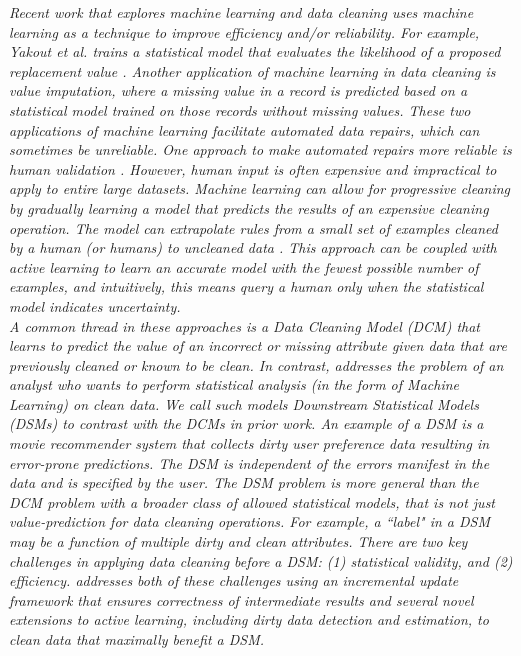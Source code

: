 \emph{Recent work that explores machine learning and data cleaning uses machine learning as a technique to improve efficiency and/or reliability.
For example, Yakout et al. trains a statistical model that evaluates the likelihood of a proposed replacement value \cite{yakout2013don}.
Another application of machine learning in data cleaning is value imputation, where a missing value in a record is predicted based on a statistical model trained on those records without missing values.
These two applications of machine learning facilitate automated data repairs, which can sometimes be unreliable. 
One approach to make automated repairs more reliable is human validation \cite{DBLP:journals/pvldb/YakoutENOI11}.
However, human input is often expensive and impractical to apply to entire large datasets.
Machine learning can allow for progressive cleaning by gradually learning a model that predicts the results of an expensive cleaning operation.
The model can extrapolate rules from a small set of examples cleaned by a human (or humans) to uncleaned data \cite{gokhale2014corleone, DBLP:journals/pvldb/YakoutENOI11}.
This approach can be coupled with active learning \cite{DBLP:journals/pvldb/MozafariSFJM14} to learn an accurate model with the fewest possible number of examples, and intuitively, this means
query a human only when the statistical model indicates uncertainty.\\
A common thread in these approaches is a Data Cleaning Model (DCM) that learns to predict the value of an incorrect or missing attribute given data that are previously cleaned or known to be clean.
In contrast, \sys addresses the problem of an analyst who wants to perform statistical analysis (in the form of Machine Learning) on clean data.
We call such models Downstream Statistical Models (DSMs) to contrast with the DCMs in prior work.
An example of a DSM is a movie recommender system that collects dirty user preference data resulting in error-prone predictions.
The DSM is independent of the errors manifest in the data and is specified by the user.
The DSM problem is more general than the DCM problem with a broader class of allowed statistical models, that is not just value-prediction for data cleaning operations.
For example, a ``label" in a DSM may be a function of multiple dirty and clean attributes.
There are two key challenges in applying data cleaning before a DSM: (1) statistical validity, and (2) efficiency. 
\sys addresses both of these challenges using an incremental update framework that ensures correctness of intermediate results and several novel extensions to active learning, including dirty data detection and estimation, to clean data that maximally benefit a DSM.
}
